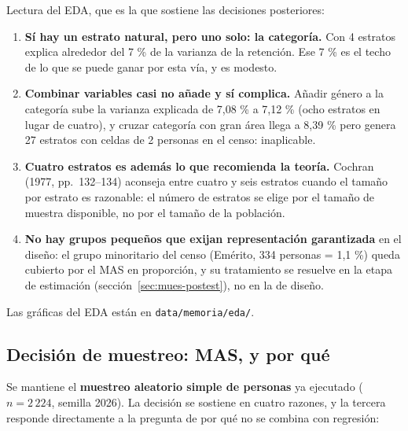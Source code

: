 Lectura del EDA, que es la que sostiene las decisiones posteriores:

\begin{enumerate}
  \item \textbf{Sí hay un estrato natural, pero uno solo: la categoría.} Con 4
        estratos explica alrededor del 7 \% de la varianza de la retención. Ese
        7 \% es el techo de lo que se puede ganar por esta vía, y es modesto.
  \item \textbf{Combinar variables casi no añade y sí complica.} Añadir género a
        la categoría sube la varianza explicada de 7,08 \% a 7,12 \% (ocho
        estratos en lugar de cuatro), y cruzar categoría con gran área llega a
        8,39 \% pero genera 27 estratos con celdas de 2 personas en el censo:
        inaplicable.
  \item \textbf{Cuatro estratos es además lo que recomienda la teoría.}
        Cochran (1977, pp.~132--134) aconseja entre cuatro y seis estratos
        cuando el tamaño por estrato es razonable: el número de estratos se
        elige por el tamaño de muestra disponible, no por el tamaño de la
        población.
  \item \textbf{No hay grupos pequeños que exijan representación garantizada} en
        el diseño: el grupo minoritario del censo (Emérito, 334 personas =
        1,1 \%) queda cubierto por el MAS en proporción, y su tratamiento se
        resuelve en la etapa de estimación
        (sección~\ref{sec:mues-postest}), no en la de diseño.
\end{enumerate}

Las gráficas del EDA están en \texttt{data/memoria/eda/}.

\subsection{Decisión de muestreo: MAS, y por qué}
\label{sec:mues-decision}

Se mantiene el \textbf{muestreo aleatorio simple de personas} ya ejecutado
($n = 2\,224$, semilla 2026). La decisión se sostiene en cuatro razones, y la
tercera responde directamente a la pregunta de por qué no se combina con
regresión:

